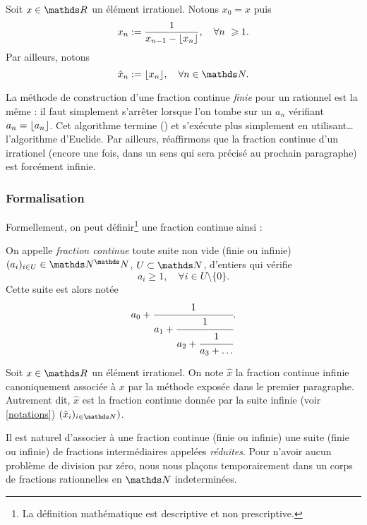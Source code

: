 \begin{notation}\label{notations}
	Soit $x\in \R$ un élément irrationel. Notons $x_0 = x$ puis \[x_n :=
	\frac{1}{x_{n-1} - \ent{x_n}}, \quad \forall n \geq 1.\] Par ailleurs,
	notons \[\hat{x}_n := \ent{x_n}, \quad \forall n\in \N.\]
\end{notation}

\begin{remarque}
	La méthode de construction d'une fraction continue \emph{finie} pour un
	rationnel est la même : il faut simplement s'arrêter lorsque l'on tombe sur
	un $a_n$ vérifiant $a_n = \lfloor a_n\rfloor$. Cet algorithme termine () et
	s'exécute plus simplement en utilisant… l'algorithme d'Euclide. Par
	ailleurs, réaffirmons que la fraction continue d'un irrationel (encore une
	fois, dans un sens qui sera précisé au prochain paragraphe) est forcément
	infinie.
\end{remarque}

\subsubsection{Formalisation}

Formellement, on peut définir\footnote{La définition mathématique est
descriptive et non prescriptive.} une fraction continue ainsi :

\begin{definition}
	On appelle \emph{fraction continue} toute suite non vide (finie ou infinie)
	$(a_i)_{i\in U} \in \N^\N$, $U\subset \N$, d'entiers qui vérifie \[a_i
	\geq 1, \quad \forall i\in U\setminus\{0\}.\] Cette suite est alors notée
	\[a_0 + \cfrac{1}{a_1 + \cfrac{1}{a_2 + \cfrac{1}{a_3 + \dots}}}.\]
\end{definition}

\begin{notation}
	Soit $x\in \R$ un élément irrationel. On note $\hat{x}$ la fraction
	continue infinie canoniquement associée à $x$ par la méthode exposée dans
	le premier paragraphe. Autrement dit, $\hat{x}$ est la fraction continue
	donnée par la suite infinie (voir \ref{notations}) $(\hat{x}_i)_{i\in
	\N})$.
\end{notation}

Il est naturel d'associer à une fraction continue (finie ou infinie) une suite
(finie ou infinie) de fractions \og intermédiaires \fg{} appelées
\emph{réduites}. Pour n'avoir aucun problème de division par zéro, nous nous
plaçons temporairement dans un corps de fractions rationnelles en $\N$
indeterminées.

